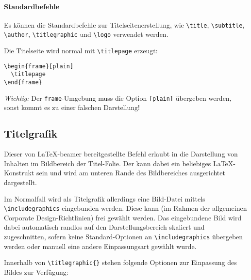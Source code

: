 \paragraph{Standardbefehle}

Es können die Standardbefehle zur Titelseitenerstellung, wie
\lstinline{\title},
\lstinline{\subtitle},
\lstinline{\author},
\lstinline{\titlegraphic}
und \lstinline{\logo} verwendet werden.

Die Titelseite wird normal mit \lstinline{\titlepage} erzeugt:

\begin{lstlisting}
\begin{frame}[plain]
  \titlepage
\end{frame}
\end{lstlisting}

\emph{Wichtig:} Der \lstinline{frame}-Umgebung muss die Option
\lstinline{[plain]} übergeben werden,
sonst kommt es zu einer falschen Darstellung!

\subsection{Titelgrafik}

\begin{Declaration}
\end{Declaration}

\begin{sloppypar}
Dieser von \LaTeX-beamer bereitgestellte Befehl erlaubt in \tubslatex
die Darstellung von Inhalten im Bildbereich der Titel-Folie.
Der  kann dabei ein beliebiges \LaTeX-Konstrukt sein
und wird am unteren Rande des Bildbereiches ausgerichtet dargestellt.

Im Normalfall wird als Titelgrafik allerdings eine Bild-Datei mittels
\lstinline{\includegraphics} eingebunden werden.
Diese kann (im Rahmen der allgemeinen Corporate Design-Richtlinien)%
frei gewählt werden.
Das eingebundene Bild wird dabei automatisch randlos
auf den Darstellungsbereich skaliert und zugeschnitten, sofern keine
Standard-Optionen an \lstinline{\includegraphics} übergeben werden oder
manuell eine andere Einpassungsart gewählt wurde.

Innerhalb von \lstinline!\titlegraphic{}! stehen folgende
Optionen zur Einpassung des Bildes zur Verfügung:
\end{sloppypar}

